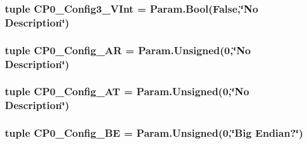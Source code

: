 \label{classMipsCPU_1_1BaseMipsCPU_a889a4f646c6296aec6e3bf2efca23faf}
\hypertarget{classMipsCPU_1_1BaseMipsCPU_abc3e3d14f240130bf820a498fbc550ed}{
\subsubsection[{CP0\_\-Config3\_\-VInt}]{\setlength{\rightskip}{0pt plus 5cm}tuple {\bf CP0\_\-Config3\_\-VInt} = Param.Bool(False,\char`\"{}No Description\char`\"{})}}
\label{classMipsCPU_1_1BaseMipsCPU_abc3e3d14f240130bf820a498fbc550ed}
\hypertarget{classMipsCPU_1_1BaseMipsCPU_a190c17f9827e26188ded0ee904871e8e}{
\subsubsection[{CP0\_\-Config\_\-AR}]{\setlength{\rightskip}{0pt plus 5cm}tuple {\bf CP0\_\-Config\_\-AR} = Param.Unsigned(0,\char`\"{}No Description\char`\"{})}}
\label{classMipsCPU_1_1BaseMipsCPU_a190c17f9827e26188ded0ee904871e8e}
\hypertarget{classMipsCPU_1_1BaseMipsCPU_a98aeda0df7710660961a4813e58eebfc}{
\subsubsection[{CP0\_\-Config\_\-AT}]{\setlength{\rightskip}{0pt plus 5cm}tuple {\bf CP0\_\-Config\_\-AT} = Param.Unsigned(0,\char`\"{}No Description\char`\"{})}}
\label{classMipsCPU_1_1BaseMipsCPU_a98aeda0df7710660961a4813e58eebfc}
\hypertarget{classMipsCPU_1_1BaseMipsCPU_a6893a0c5c82cdbd1a26d85c8110c96c3}{
\subsubsection[{CP0\_\-Config\_\-BE}]{\setlength{\rightskip}{0pt plus 5cm}tuple {\bf CP0\_\-Config\_\-BE} = Param.Unsigned(0,\char`\"{}Big Endian?\char`\"{})}}
